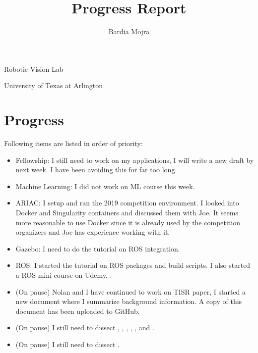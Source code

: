 \documentclass[11pt]{article}
\title{Progress Report}
\author{Bardia Mojra}
\begin{document}
	\maketitle
	\thispagestyle{empty}

\begin{center}
\bigskip
\bigskip
Robotic Vision Lab
 
University of Texas at Arlington
\end{center}

\newpage 

\section{Progress}
Following items are listed in order of priority: 
\begin{itemize}  

  	\item Fellowship: I still need to work on my applications, I will write a new draft by next week. I have been avoiding this for far too long. 
  	
  	\item Machine Learning: I did not work on ML course this week. 
  	
  	\item ARIAC: I setup and ran the 2019 competition environment. I looked into Docker and Singularity containers and discussed them with Joe. It seems more reasonable to use Docker since it is already used by the competition organizers and Joe has experience working with it. 
    
    \item Gazebo: I need to do the tutorial on ROS integration.
    
  	\item ROS: I started the tutorial on ROS packages and build scripts. I also started a ROS mini course on Udemy, \cite{LearningROS}.
  
  	\item (On pause) Nolan and I have continued to work on TISR paper, I started a new document where I summarize background information. A copy of this document has been uploaded to GitHub.
 
  	\item (On pause) I still need to dissect \cite{PanopticSeg2019}, \cite{SVO}, \cite{HornsMethod}, \cite{NYUV2}, \cite{DGCNNLPC}, and \cite{MaskRCNN}.
  	
  	\item (On pause) I still need to dissect \cite{ZinsserWilliamKnowlton2006Oww}. 
\end{itemize}
\end{document}
